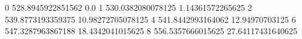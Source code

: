 0 528.8945922851562 0.0
1 530.0382080078125 1.14361572265625
2 539.8773193359375 10.98272705078125
4 541.8442993164062 12.94970703125
6 547.3287963867188 18.4342041015625
8 556.5357666015625 27.64117431640625
